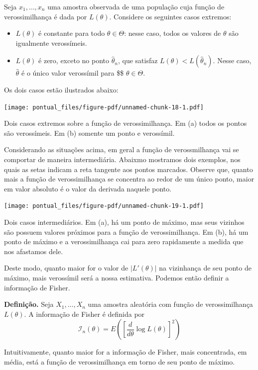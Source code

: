 \documentclass[
  letterpaper,
  DIV=11,
  numbers=noendperiod]{scrartcl}
\begin{document}
Seja \(x_1,\ldots,x_n\) uma amostra observada de uma população cuja
função de verossimilhança é dada por \(L(\theta)\). Considere os
seguintes casos extremos:

\begin{itemize}
\item
  \(L(\theta)\) é constante para todo \(\theta\in\Theta\): nesse caso,
  todos os valores de \(\theta\) são igualmente verossímeis.
\item
  \(L(\theta)\) é zero, exceto no ponto \(\hat{\theta}_n\), que satisfaz
  \(L(\theta)<L(\hat{\theta}_n)\). Nesse caso, \(\hat{\theta}\) é o
  único valor verossímil para \$\$ \(\theta\in\Theta\).
\end{itemize}

Os dois casos estão ilustrados abaixo:

\label{fig}
\texttt{[image: pontual\_files/figure-pdf/unnamed-chunk-18-1.pdf]}

Dois casos extremos sobre a função de verossimilhança. Em (a) todos os
pontos são verossímeis. Em (b) somente um ponto e verossímil.

Considerando as situações acima, em geral a função de verossmilhança vai
se comportar de maneira intermediária. Abaixmo mostramos dois exemplos,
nos quais as setas indicam a reta tangente aos pontos marcados. Observe
que, quanto mais a função de verossimilhança se concentra ao redor de um
único ponto, maior em valor absoluto é o valor da derivada naquele
ponto.

\label{fig}
\texttt{[image: pontual\_files/figure-pdf/unnamed-chunk-19-1.pdf]}

Dois casos intermediários. Em (a), há um ponto de máximo, mas seus
vizinhos são possuem valores próximos para a função de verossimilhança.
Em (b), há um ponto de máximo e a verossimilhança cai para zero
rapidamente a medida que nos afastamos dele.

Deste modo, quanto maior for o valor de \(|L'(\theta)|\) na vizinhança
de seu ponto de máximo, mais verossímil será a nossa estimativa. Podemos
então definir a informação de Fisher.

\textbf{Definição.} Seja \(X_1,\ldots,X_n\) uma amostra aleatória com
função de verossimilhança \(L(\theta)\). A informação de Fisher é
definida por
\[\mathcal{I}_n(\theta)=E\left(\left[\frac{d}{d\theta}\log L(\theta)\right]^2\right)\]

Intuitivamente, quanto maior for a informação de Fisher, mais
concentrada, em média, está a função de verossimilhança em torno de seu
ponto de máximo.
\end{document}
